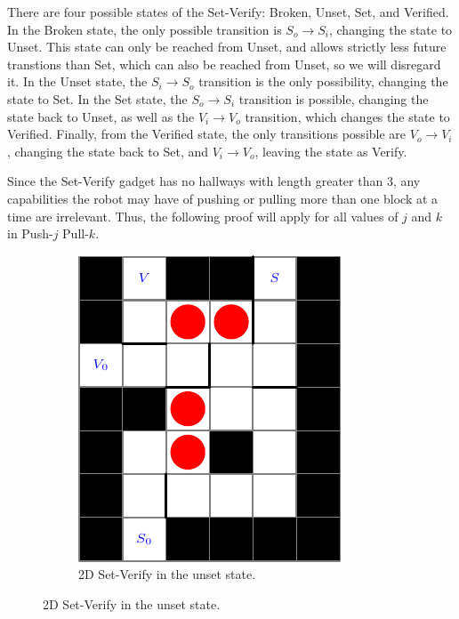 \documentclass[11pt]{article}
\begin{document}
There are four possible states of the Set-Verify: Broken, Unset, Set, and Verified. In the Broken state, the only possible transition is $S_o \rightarrow S_i$, changing the state to Unset. This state can only be reached from Unset, and allows strictly less future transtions than Set, which can also be reached from Unset, so we will disregard it. In the Unset state, the $S_i \rightarrow S_o$ transition is the only possibility, changing the state to Set. In the Set state, the $S_o \rightarrow S_i$ transition is possible, changing the state back to Unset, as well as the $V_i \rightarrow V_o$ transition, which changes the state to Verified. Finally, from the Verified state, the only transitions possible are $V_o \rightarrow V_i$, changing the state back to Set, and $V_i \rightarrow V_o$, leaving the state as Verify.

Since the Set-Verify gadget has no hallways with length greater than 3, any capabilities the robot may have of pushing or pulling more than one block at a time are irrelevant. Thus, the following proof will apply for all values of $j$ and $k$ in Push-$j$ Pull-$k$.

\begin{figure}[!ht]
  \centering
  \caption{Set-Verify Gadget}
  \begin{subfigure}[b]{0.45\textwidth}
    \includegraphics[width=\textwidth]{SetVerifyUnset}
    \caption{2D Set-Verify in the unset state.}
    \label{ldeDiagrams}
  \end{subfigure}
\end{figure}
\end{document}
